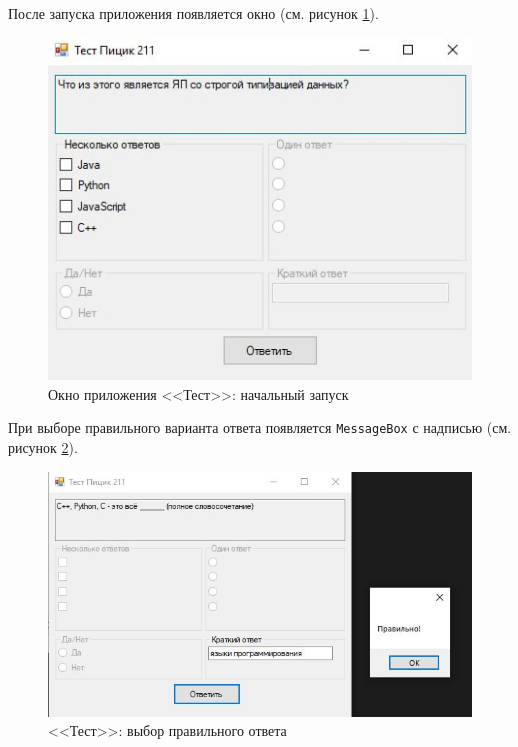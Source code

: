 После запуска приложения появляется окно (см. рисунок \ref{fig:test_res}).
\begin{figure}[H]
    \centering
    \includegraphics[scale=.85]{../img/test/test_res.jpg}
    \caption{Окно приложения <<Тест>>: начальный запуск}
    \label{fig:test_res}
\end{figure}

При выборе правильного варианта ответа появляется \verb|MessageBox| с надписью
(см. рисунок \ref{fig:test_correct}).
\begin{figure}[H]
\centering
\includegraphics[scale=.85]{../img/test/test_correct.jpg}
\caption{<<Тест>>: выбор правильного ответа}
\label{fig:test_correct}
\end{figure}

